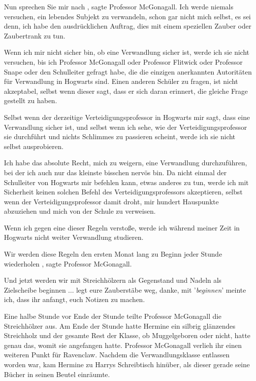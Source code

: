 \glqq Nun sprechen Sie mir nach\grqq{} , sagte Professor McGonagall. \glqq Ich
werde niemals versuchen, ein lebendes Subjekt zu verwandeln, schon gar nicht
mich selbst, es sei denn, ich habe den ausdrücklichen Auftrag, dies mit einem
speziellen Zauber oder Zaubertrank zu tun.\grqq{}

\glqq Wenn ich mir nicht sicher bin, ob eine Verwandlung sicher ist, werde ich
sie nicht versuchen, bis ich Professor McGonagall oder Professor Flitwick oder
Professor Snape oder den Schulleiter gefragt habe, die die einzigen anerkannten
Autoritäten für Verwandlung in Hogwarts sind. Einen anderen Schüler zu fragen,
ist nicht akzeptabel, selbst wenn dieser sagt, dass er sich daran erinnert, die
gleiche Frage gestellt zu haben.\grqq{}

\glqq Selbst wenn der derzeitige Verteidigungsprofessor in Hogwarts mir sagt,
dass eine Verwandlung sicher ist, und selbst wenn ich sehe, wie der
Verteidigungsprofessor sie durchführt und nichts Schlimmes zu passieren scheint,
werde ich sie nicht selbst ausprobieren.\grqq{}

\glqq Ich habe das absolute Recht, mich zu weigern, eine Verwandlung
durchzuführen, bei der ich auch nur das kleinste bisschen nervös bin. Da nicht
einmal der Schulleiter von Hogwarts mir befehlen kann, etwas anderes zu tun,
werde ich mit Sicherheit keinen solchen Befehl des Verteidigungsprofessors
akzeptieren, selbst wenn der Verteidigungsprofessor damit droht, mir hundert
Hauspunkte abzuziehen und mich von der Schule zu verweisen.\grqq{}

\glqq Wenn ich gegen eine dieser Regeln verstoße, werde ich während meiner Zeit
in Hogwarts nicht weiter Verwandlung studieren.\grqq{}

\glqq Wir werden diese Regeln den ersten Monat lang zu Beginn jeder Stunde
wiederholen\grqq{} , sagte Professor McGonagall.

\glqq Und jetzt werden wir mit Streichhölzern als Gegenstand und Nadeln als
Zielscheibe beginnen ... legt eure Zauberstäbe weg, danke, mit '\emph{beginnen}'
meinte ich, dass ihr anfangt, euch Notizen zu machen.\grqq{}

Eine halbe Stunde vor Ende der Stunde teilte Professor McGonagall die
Streichhölzer aus. Am Ende der Stunde hatte Hermine ein silbrig glänzendes
Streichholz und der gesamte Rest der Klasse, ob Muggelgeboren oder nicht, hatte
genau das, womit sie angefangen hatte. Professor McGonagall verlieh ihr einen
weiteren Punkt für Ravenclaw. Nachdem die Verwandlungsklasse entlassen worden
war, kam Hermine zu Harrys Schreibtisch hinüber, als dieser gerade seine Bücher
in seinen Beutel einräumte.

